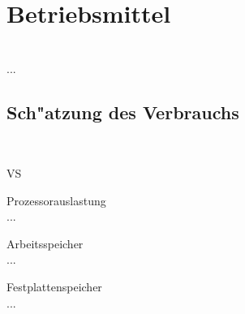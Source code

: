 %
%


\chapter{Betriebsmittel}
\label{BM}

~\\
...

\section{Sch{"a}tzung des Verbrauchs}
\label{BM:Verbrauch}

~\\

\begin{ids}{\gls{VS}}

	\id[10] Prozessorauslastung \hfill\\
	
	...
	
	\id[20] Arbeitsspeicher \hfill\\
	
	...
	
	\id[30] Festplattenspeicher \hfill\\
		
	...

\end{ids}


